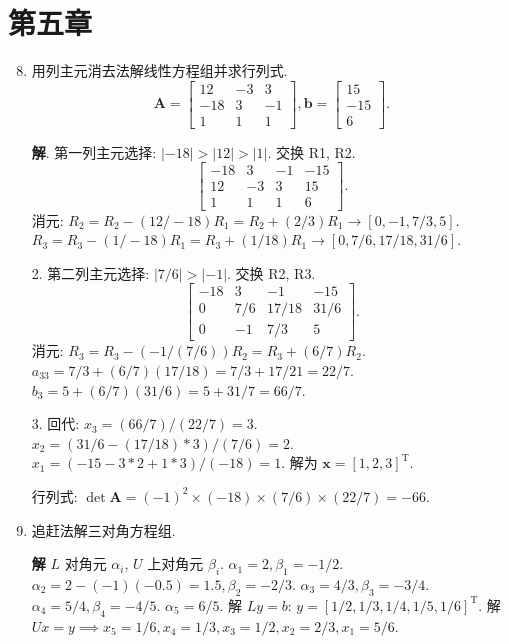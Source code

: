 \documentclass[a4paper,11pt]{ctexart}
\newcommand{\sol}{\par\noindent\textbf{解}\quad}
\newcommand{\T}{\mathrm{T}}        %
\begin{document}
\section*{第五章}

\begin{enumerate}[label=\textbf{5-\arabic*.}, leftmargin=*]
    \setcounter{enumi}{7}
    \item 用列主元消去法解线性方程组并求行列式.
    \[
    \bm{A} = \begin{bmatrix} 12 & -3 & 3 \\ -18 & 3 & -1 \\ 1 & 1 & 1 \end{bmatrix}, \bm{b} = \begin{bmatrix} 15 \\ -15 \\ 6 \end{bmatrix}.
    \]
    
    \sol
    1. 第一列主元选择: $|-18| > |12| > |1|$. 交换 R1, R2.
    \[
    \begin{bmatrix} -18 & 3 & -1 & -15 \\ 12 & -3 & 3 & 15 \\ 1 & 1 & 1 & 6 \end{bmatrix}.
    \]
    消元:
    $R_2 = R_2 - (12/-18)R_1 = R_2 + (2/3)R_1 \to [0, -1, 7/3, 5]$.
    $R_3 = R_3 - (1/-18)R_1 = R_3 + (1/18)R_1 \to [0, 7/6, 17/18, 31/6]$.
    
    2. 第二列主元选择: $|7/6| > |-1|$. 交换 R2, R3.
    \[
    \begin{bmatrix} -18 & 3 & -1 & -15 \\ 0 & 7/6 & 17/18 & 31/6 \\ 0 & -1 & 7/3 & 5 \end{bmatrix}.
    \]
    消元: $R_3 = R_3 - (-1 / (7/6))R_2 = R_3 + (6/7)R_2$.
    $a_{33} = 7/3 + (6/7)(17/18) = 7/3 + 17/21 = 22/7$.
    $b_3 = 5 + (6/7)(31/6) = 5 + 31/7 = 66/7$.
    
    3. 回代:
    $x_3 = (66/7) / (22/7) = 3$.
    $x_2 = (31/6 - (17/18)*3) / (7/6) = 2$.
    $x_1 = (-15 - 3*2 + 1*3) / (-18) = 1$.
    解为 $\bm{x} = [1, 2, 3]^\T$.
    
    行列式: $\det \bm{A} = (-1)^2 \times (-18) \times (7/6) \times (22/7) = -66$.

    \item[9.] 追赶法解三对角方程组.
    \sol 
    $L$ 对角元 $\alpha_i$, $U$ 上对角元 $\beta_i$.
    $\alpha_1 = 2, \beta_1 = -1/2$.
    $\alpha_2 = 2 - (-1)(-0.5) = 1.5, \beta_2 = -2/3$.
    $\alpha_3 = 4/3, \beta_3 = -3/4$.
    $\alpha_4 = 5/4, \beta_4 = -4/5$.
    $\alpha_5 = 6/5$.
    解 $Ly = b$: $y = [1/2, 1/3, 1/4, 1/5, 1/6]^\T$.
    解 $Ux = y \implies x_5 = 1/6, x_4 = 1/3, x_3 = 1/2, x_2 = 2/3, x_1 = 5/6$.


\end{enumerate}
\end{document}
